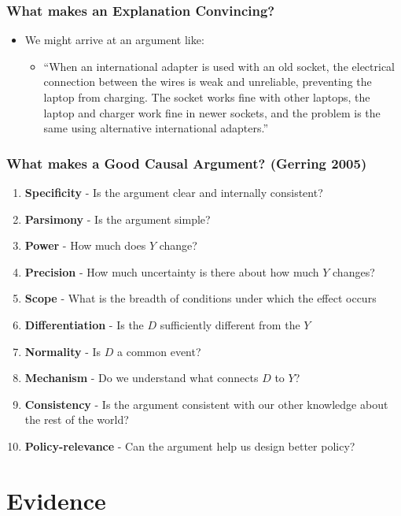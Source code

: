 \documentclass[xcolor=x11names,compress]{beamer}\usepackage[]{graphicx}\usepackage[]{color}
\renewcommand{\(}{\begin{columns}}
\renewcommand{\)}{\end{columns}}
\newcommand{\<}[1]{\begin{column}{#1}}
\renewcommand{\>}{\end{column}}
\begin{document}
\begin{frame}
\frametitle{What makes an Explanation Convincing?}
\begin{itemize}
\item We might arrive at an argument like:
\begin{itemize}
\item ``When an international adapter is used with an old socket, the electrical connection between the wires is weak and unreliable, preventing the laptop from charging. The socket works fine with other laptops, the laptop and charger work fine in newer sockets, and the problem is the same using alternative international adapters.'' 
\end{itemize}
\end{itemize}
\end{frame}

\begin{frame}
\frametitle{What makes a Good Causal Argument? (Gerring 2005)}
\begin{enumerate}
\item \textbf{Specificity} - Is the argument clear and internally consistent?
\pause
\item \textbf{Parsimony} - Is the argument simple?
\pause
\item \textbf{Power} - How much does $Y$ change?
\pause
\item \textbf{Precision} - How much uncertainty is there about how much $Y$ changes?
\pause
\item \textbf{Scope} - What is the breadth of conditions under which the effect occurs
\pause
\item \textbf{Differentiation} - Is the $D$ sufficiently different from the $Y$
\pause
\item \textbf{Normality} - Is $D$ a common event?
\pause
\item \textbf{Mechanism} - Do we understand what connects $D$ to $Y$?
\pause
\item \textbf{Consistency} - Is the argument consistent with our other knowledge about the rest of the world?
\pause
\item \textbf{Policy-relevance} - Can the argument help us design better policy?
\end{enumerate}
\end{frame}

\section{Evidence}
\end{document}
